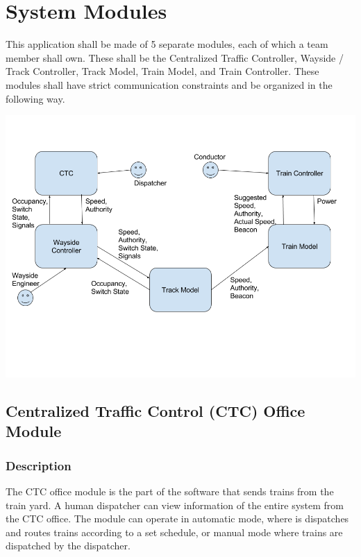\documentclass{scrreprt}
\begin{document}


\chapter{System Modules}
This application shall be made of 5 separate modules, each of which a team member shall own.
These shall be the Centralized Traffic Controller, Wayside / Track Controller, Track Model, Train Model, and Train Controller.
These modules shall have strict communication constraints and be organized in the following way.

\includegraphics[width=\textwidth]{srs-module-overview}

\section{Centralized Traffic Control (CTC) Office Module}

\subsection{Description}
The CTC office module is the part of the software that sends trains from the
train yard. A human dispatcher can view information of the entire system
from the CTC office. The module can operate in automatic mode, where is dispatches
and routes trains according to a set schedule, or manual mode where trains are
dispatched by the dispatcher.
\end{document}
